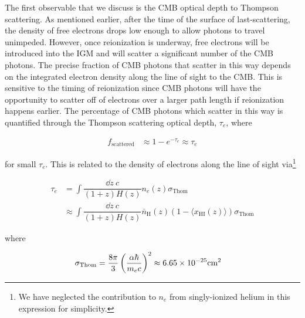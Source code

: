 The first observable that we discuss is the CMB optical depth to Thompson scattering. As mentioned earlier, after the time of the surface of last-scattering, the density of free electrons drops low enough to allow photons to travel unimpeded. However, once reionization is underway, free electrons will be introduced into the IGM and will scatter a significant number of the CMB photons. The precise fraction of CMB photons that scatter in this way depends on the integrated electron density along the line of sight to the CMB. This is sensitive to the timing of reionization since CMB photons will have the opportunity to scatter off of electrons over a larger path length if reionization happens earlier. The percentage of CMB photons which scatter in this way is quantified through the Thompson scattering optical depth, $\tau_{e}$, where

\begin{align}
f_{\text{scattered}} &\approx 1-e^{-\tau_{e}} \approx \tau_{e}
\end{align}

for small $\tau_{e}$. This is related to the density of electrons along the line of sight via\footnote{We have neglected the contribution to $n_e$ from singly-ionized helium in this expression for simplicity.}

\begin{align}
\tau_{e} &= \int \dfrac{\dd z\ c}{(1+z)H(z)}n_{e}(z)\sigma_{\text{Thom}}\\
&\approx \int \dfrac{\dd z\ c}{(1+z)H(z)} \bar{n}_{\text{H}}(z)(1 - \langle x_{\text{HI}}(z)\rangle) \sigma_{\text{Thom}} \label{eq:taue}
\end{align}

where 

\begin{align}
\sigma_{\text{Thom}} &= \dfrac{8\pi}{3}\left(\dfrac{\alpha \hbar}{m_ec}\right)^2 \approx 6.65\times 10^{-25}\text{cm}^{2}
\end{align}

